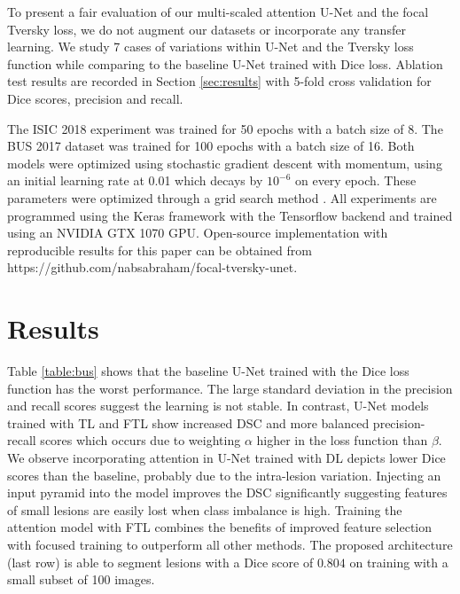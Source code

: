 \documentclass{article}
\begin{document}
To present a fair evaluation of our multi-scaled attention U-Net and the focal Tversky loss, we do not augment our datasets or incorporate any transfer learning. We study 7 cases of variations within U-Net and the Tversky loss function while comparing to the baseline U-Net trained with Dice loss. Ablation test results are recorded in Section \ref{sec:results} with 5-fold cross validation for Dice scores, precision and recall. 

The ISIC 2018 experiment was trained for 50 epochs with a batch size of 8. The BUS 2017 dataset was trained for 100 epochs with a batch size of 16. Both models were optimized using stochastic gradient descent with momentum, using an initial learning rate at 0.01 which decays by $10^{-6}$ on every epoch. These parameters were optimized through a grid search method \cite{gridsearch}. All experiments are programmed using the Keras framework with the Tensorflow backend and trained using an NVIDIA GTX 1070 GPU. Open-source implementation with reproducible results for this paper can be obtained from https://github.com/nabsabraham/focal-tversky-unet.

\section{Results}
Table \ref{table:bus} shows that the baseline U-Net trained with the Dice loss function has the worst performance. The large standard deviation in the precision and recall scores suggest the learning is not stable. In contrast, U-Net models trained with TL and FTL show increased DSC and more balanced precision-recall scores which occurs due to weighting $\alpha$ higher in the loss function than $\beta$. We observe incorporating attention in U-Net trained with DL depicts lower Dice scores than the baseline, probably due to the intra-lesion variation. Injecting an input pyramid into the model improves the DSC significantly suggesting features of small lesions are easily lost when class imbalance is high. Training the attention model with FTL combines the benefits of improved feature selection with focused training to outperform all other methods. The proposed architecture (last row) is able to segment lesions with a Dice score of $0.804$ on training with a small subset of 100 images. 
\end{document}
